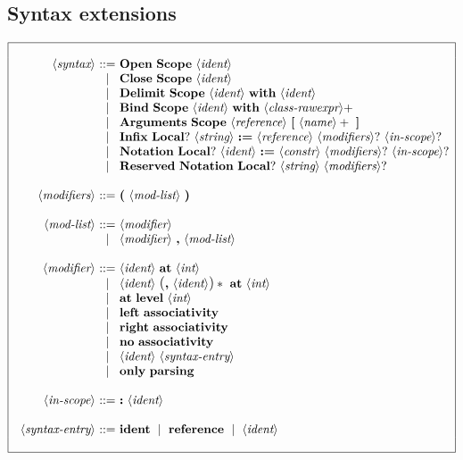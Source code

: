 \documentclass{article}
\makeatletter
\def\GR#1{\text{\large(}#1\text{\large)}}
\def\NT#1{\langle\textit{#1}\rangle}
\def\TERM#1{{\bf\textrm{\bf #1}}}
\def\KWD#1{\TERM{#1}}
\def\STARGR#1{\GR{#1}*}
\def\PLUS#1{#1+}
\def\OPT#1{#1?}
\newenvironment{cadre}
        {\begin{array}{|c|}\hline\\}
        {\\\\\hline\end{array}}
\newenvironment{rulebox}
        {$$\begin{cadre}\begin{array}{r@{~}c@{~}l@{}l@{}r}}
        {\end{array}\end{cadre}$$}
\def\DEFNT#1{\NT{#1} & ::= &}
\def\SEPDEF{\\\\}
\def\nlsep{\\&|&}
\newenvironment{rules}
        {\begin{center}\begin{rulebox}}
        {\end{rulebox}\end{center}}
\makeatother
\begin{document}
\subsection{Syntax extensions}

\begin{rules}
\DEFNT{syntax}
       \TERM{Open}~\TERM{Scope}~\NT{ident}
\nlsep \TERM{Close}~\TERM{Scope}~\NT{ident}
\nlsep \TERM{Delimit}~\TERM{Scope}~\NT{ident}~\KWD{with}~\NT{ident}
\nlsep \TERM{Bind}~\TERM{Scope}~\NT{ident}~\KWD{with}~\PLUS{\NT{class-rawexpr}}
\nlsep \TERM{Arguments}~\TERM{Scope}~\NT{reference}
       ~\TERM{[}~\PLUS{\NT{name}}~\TERM{]}
\nlsep \TERM{Infix}~\OPT{\TERM{Local}} %
       ~\NT{string}~\KWD{:=}~\NT{reference}~\OPT{\NT{modifiers}}
       ~\OPT{\NT{in-scope}}
\nlsep \TERM{Notation}~\OPT{\TERM{Local}}~\NT{ident}~\KWD{:=}~\NT{constr}
       ~\OPT{\NT{modifiers}}~\OPT{\NT{in-scope}}
\nlsep \TERM{Reserved}~\TERM{Notation}~\OPT{\TERM{Local}}~\NT{string}
       ~\OPT{\NT{modifiers}}
\SEPDEF
\DEFNT{modifiers}
       \KWD{(}~\NT{mod-list}~\KWD{)}
\SEPDEF
\DEFNT{mod-list}
       \NT{modifier}
\nlsep \NT{modifier}~\KWD{,}~\NT{mod-list}
\SEPDEF
\DEFNT{modifier}
       \NT{ident}~\KWD{at}~\NT{int}
\nlsep \NT{ident}~\STARGR{\KWD{,}~\NT{ident}}~\KWD{at}~\NT{int}
\nlsep \KWD{at}~\TERM{level}~\NT{int}
\nlsep \TERM{left}~\TERM{associativity}
\nlsep \TERM{right}~\TERM{associativity}
\nlsep \TERM{no}~\TERM{associativity}
\nlsep \NT{ident}~\NT{syntax-entry}
\nlsep \TERM{only}~\TERM{parsing}
\SEPDEF
\DEFNT{in-scope}
       \KWD{:}~\NT{ident}
\SEPDEF
\DEFNT{syntax-entry}
       \TERM{ident}~\mid~\TERM{reference}~\mid~\NT{ident}
\end{rules}
\end{document}
